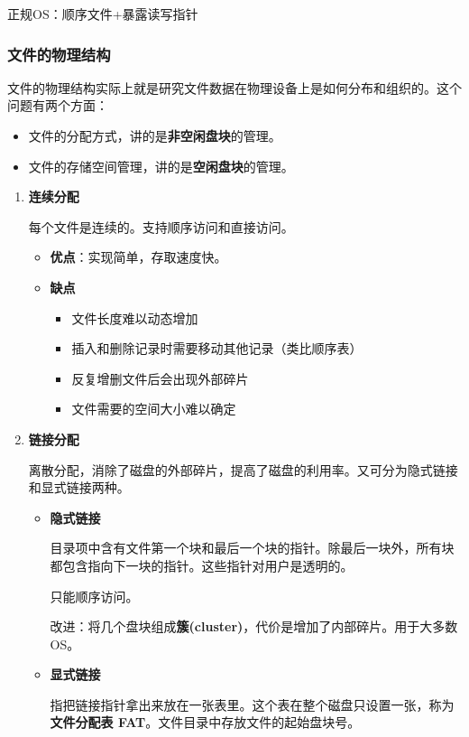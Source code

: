 \documentclass[12pt, a4paper, oneside]{ctexart}
\begin{document}
正规OS：顺序文件+暴露读写指针

\subsubsection{文件的物理结构}

文件的物理结构实际上就是研究文件数据在物理设备上是如何分布和组织的。这个问题有两个方面：
\begin{itemize}
  \item 文件的分配方式，讲的是\textbf{非空闲盘块}的管理。
  \item 文件的存储空间管理，讲的是\textbf{空闲盘块}的管理。
\end{itemize}

\begin{enumerate}
  \item {\bf 连续分配}
  
  每个文件是连续的。支持顺序访问和直接访问。
  \begin{itemize}
    \item {\bf 优点}：实现简单，存取速度快。
    \item {\bf 缺点}
    \begin{itemize}
      \item 文件长度难以动态增加
      \item 插入和删除记录时需要移动其他记录（类比顺序表）
      \item 反复增删文件后会出现外部碎片
      \item 文件需要的空间大小难以确定
    \end{itemize}
  \end{itemize}

  \item {\bf 链接分配}
  
  离散分配，消除了磁盘的外部碎片，提高了磁盘的利用率。又可分为隐式链接和显式链接两种。
  \begin{itemize}
    \item {\bf 隐式链接}
    
    目录项中含有文件第一个块和最后一个块的指针。除最后一块外，所有块都包含指向下一块的指针。这些指针对用户是透明的。

    只能顺序访问。

    改进：将几个盘块组成\textbf{簇(cluster)}，代价是增加了内部碎片。用于大多数OS。
    \item {\bf 显式链接}
    
    指把链接指针拿出来放在一张表里。这个表在整个磁盘只设置一张，称为\textbf{文件分配表 FAT}。文件目录中存放文件的起始盘块号。


\end{itemize}
\end{enumerate}
\end{document}
